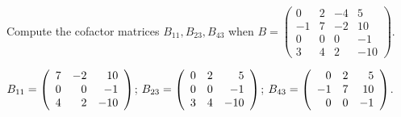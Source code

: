 \documentclass{ximera}
\begin{document}
\begin{exercise} \label{c10.1.b7b}
Compute the cofactor matrices $B_{11}, B_{23}, B_{43}$ when
$B = \left( \begin{array}{rrrr}
 0 & 2 & -4 & 5\\
 -1 & 7 & -2 & 10\\
 0 & 0 & 0  & -1\\
3 & 4 & 2 & -10
\end{array} \right)$.

\begin{solution}
\ans
$B_{11} = \left(\begin{array}{rrr} 7 & -2 & 10 \\ 0 & 0 & -1 \\ 4 & 2 & -10\end{array}\right)$;
$B_{23} = \left(\begin{array}{rrr} 0 & 2 & 5 \\ 0 & 0 & -1 \\ 3 & 4 & -10\end{array}\right)$;
$B_{43} = \left(\begin{array}{rrr} 0 & 2 & 5 \\ -1 & 7 & 10 \\ 0 & 0 & -1\end{array}\right)$.

\end{solution}
\end{exercise}
\end{document}
